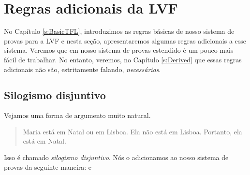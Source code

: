 
\chapter{Regras adicionais da LVF}\label{s:Further}
No Cap\'itulo \ref{s:BasicTFL}, introduzimos as regras b\'asicas de nosso sistema de provas para a LVF e nesta se\c c\~ao, apresentaremos algumas regras adicionais a esse sistema.  Veremos que em  nosso sistema de provas estendido \'e um pouco mais f\'acil de trabalhar.  No entanto, veremos, no Cap\'itulo \ref{s:Derived} que essas regras adicionais n\~ao s\~ao, estritamente falando, \emph{necess\'arias}.


\section{Silogismo disjuntivo}
Vejamos uma forma de argumento muito natural.
	\begin{quote}
		Maria est\'a em Natal ou em Lisboa. Ela n\~ao est\'a em Lisboa. Portanto, ela est\'a em Natal.
	\end{quote}
Isso \'e chamado  \emph{silogismo disjuntivo}. N\'os o adicionamos ao nosso sistema de provas da seguinte maneira:
e

